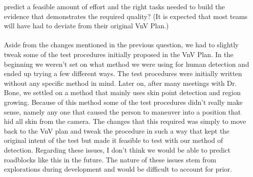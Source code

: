 \documentclass[12pt, titlepage]{article}
\begin{document}
\begin{enumerate}
  predict a feasible amount of effort and the right tasks needed to build the
  evidence that demonstrates the required quality?  (It is expected that most
  teams will have had to deviate from their original VnV Plan.) \\
  \\
  Aside from the changes mentioned in the previous question, we had to slightly tweak some of the test procedures initially proposed in the VnV Plan. In the beginning we weren't set on what method we were using for human detection and ended up trying a few different ways. The test procedures were initially written without any specific method in mind. Later on, after many meetings with Dr. Bone, we settled on a method that mainly uses skin point detection and region growing. Because of this method some of the test procedures didn't really make sense, namely any one that caused the person to maneuver into a position that hid all skin from the camera. The changes that this required was simply to move back to the VnV plan and tweak the procedure in such a way that kept the original intent of the test but made it feasible to test with our method of detection. Regarding these issues, I don't think we would be able to predict roadblocks like this in the future. The nature of these issues stem from explorations during development and would be difficult to account for prior.
\end{enumerate}
\end{document}
